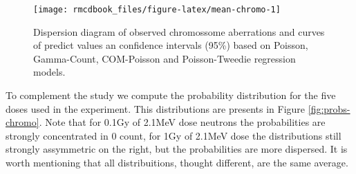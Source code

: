 \documentclass[9pt,a5paper,]{book}
\theoremstyle{definition}
\theoremstyle{definition}
\theoremstyle{remark}
\begin{document}
\begin{figure}[h]

{\centering \texttt{[image: rmcdbook\_files/figure-latex/mean-chromo-1]} 

}

\caption{Dispersion diagram of observed chromossome aberrations and curves of predict values an confidence intervals (95\%) based on Poisson, Gamma-Count, COM-Poisson and Poisson-Tweedie regression models.}\label{fig:mean-chromo}
\end{figure}

To complement the study we compute the probability distribution for the
five doses used in the experiment. This distributions are presents in
Figure \ref{fig:probs-chromo}. Note that for 0.1Gy of 2.1MeV dose
neutrons the probabilities are strongly concentrated in 0 count, for 1Gy
of 2.1MeV dose the distributions still strongly assymmetric on the
right, but the probabilities are more dispersed. It is worth mentioning
that all distribuitions, thought different, are the same average.
\end{document}
